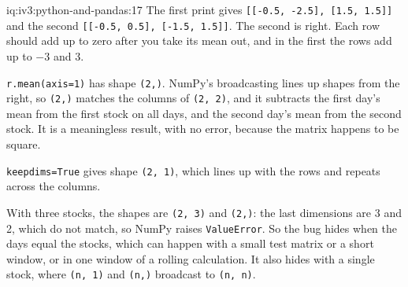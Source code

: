 \begin{solution}{iq:iv3:python-and-pandas:17}
The first print gives \texttt{[[-0.5, -2.5], [1.5, 1.5]]} and the second \texttt{[[-0.5, 0.5], [-1.5, 1.5]]}. The second is right. Each row should add up to zero after you take its mean out, and in the first the rows add up to $-3$ and $3$.

\texttt{r.mean(axis=1)} has shape \texttt{(2,)}. NumPy's broadcasting lines up shapes from the right, so \texttt{(2,)} matches the columns of \texttt{(2, 2)}, and it subtracts the first day's mean from the first stock on all days, and the second day's mean from the second stock. It is a meaningless result, with no error, because the matrix happens to be square.

\texttt{keepdims=True} gives shape \texttt{(2, 1)}, which lines up with the rows and repeats across the columns.

With three stocks, the shapes are \texttt{(2, 3)} and \texttt{(2,)}: the last dimensions are 3 and 2, which do not match, so NumPy raises \texttt{ValueError}. So the bug hides when the days equal the stocks, which can happen with a small test matrix or a short window, or in one window of a rolling calculation. It also hides with a single stock, where \texttt{(n, 1)} and \texttt{(n,)} broadcast to \texttt{(n, n)}.

\end{solution}

